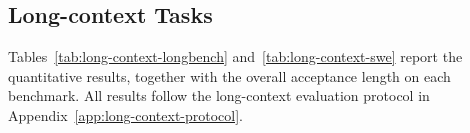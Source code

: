 \subsection{Long-context Tasks}
\label{app:long-context}

Tables~\ref{tab:long-context-longbench} and~\ref{tab:long-context-swe} report the quantitative results, together with the overall acceptance length on each benchmark. All results follow the long-context evaluation protocol in Appendix~\ref{app:long-context-protocol}.

\begin{table}[!t]
\centering
\caption{Acceptance length ($\tau$) on LongBench-v2 with Ling3-Flash, grouped by request-start prompt length. All methods use the same 401 requests. The Overall column reports results over the full evaluation subset. Bold marks the best acceptance length per column.}
\label{tab:long-context-longbench}
\begingroup
\small
\setlength{\tabcolsep}{4pt}
\renewcommand{\arraystretch}{0.95}
\endgroup
\end{table}

